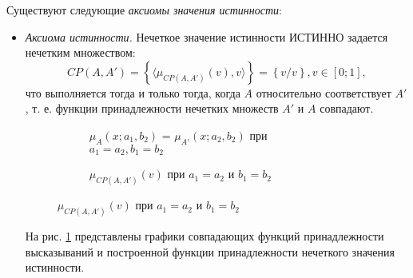 Существуют следующие \textit{аксиомы значения истинности}:
\begin{itemize}
\item \textit{Аксиома истинности.} Нечеткое значение истинности ИСТИННО задается нечетким множеством:
\begin{equation*} 
CP(A,A') = \left\{\langle\mu_{CP(A,A')}(v), v\rangle\right\} = \left\{v/v\right\}, v \in [0; 1],
\end{equation*}
что выполняется тогда и только тогда, когда $A$ относительно соответствует $A'$, т. е. функции принадлежности нечетких множеств $A'$ и $A$ совпадают.


\begin{figure}[ht]
	\newcommand{\aOne}{0.5}
	\newcommand{\bOne}{0.05}
	\newcommand{\aTwo}{0.5}
	\newcommand{\bTwo}{0.05}
	\begin{subfigure}[t]{0.5\textwidth}
		\caption{$\mu_A(x; a_1, b_2)$ = $\mu_{A'}(x; a_2, b_2)$ при $a_1 = a_2, b_1 = b_2$}
	\end{subfigure}
	\hfill
	\begin{subfigure}[t]{0.5\textwidth}
		\caption{$\mu_{CP(A,A')}(v)$ при $a_1 = a_2$ и $b_1 = b_2$}
	\end{subfigure}
	\label{fig:ftv-gauss-true}
\end{figure}

На рис. \cref{fig:ftv-gauss-true} представлены графики совпадающих функций принадлежности высказываний и построенной функции принадлежности нечеткого значения истинности.


\end{itemize}
